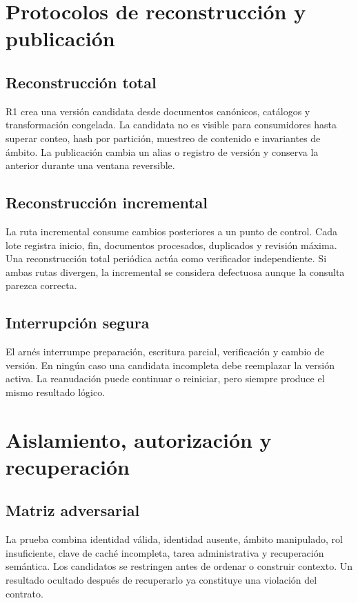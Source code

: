 \chapter{Protocolos de reconstrucción y publicación}

\section{Reconstrucción total}

R1 crea una versión candidata desde documentos canónicos, catálogos y transformación
congelada. La candidata no es visible para consumidores hasta superar conteo, hash por
partición, muestreo de contenido e invariantes de ámbito. La publicación cambia un alias
o registro de versión y conserva la anterior durante una ventana reversible.

\section{Reconstrucción incremental}

La ruta incremental consume cambios posteriores a un punto de control. Cada lote registra
inicio, fin, documentos procesados, duplicados y revisión máxima. Una reconstrucción
total periódica actúa como verificador independiente. Si ambas rutas divergen, la
incremental se considera defectuosa aunque la consulta parezca correcta.

\section{Interrupción segura}

El arnés interrumpe preparación, escritura parcial, verificación y cambio de versión. En
ningún caso una candidata incompleta debe reemplazar la versión activa. La reanudación
puede continuar o reiniciar, pero siempre produce el mismo resultado lógico.

\chapter{Aislamiento, autorización y recuperación}

\section{Matriz adversarial}

La prueba combina identidad válida, identidad ausente, ámbito manipulado, rol insuficiente,
clave de caché incompleta, tarea administrativa y recuperación semántica. Los candidatos
se restringen antes de ordenar o construir contexto. Un resultado ocultado después de
recuperarlo ya constituye una violación del contrato.

